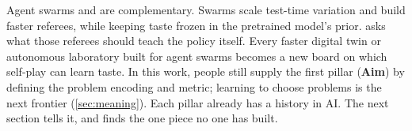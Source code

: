 Agent swarms and \EZ{} are complementary. Swarms scale test-time variation and build faster referees, while keeping taste frozen in the pretrained model's prior. \EZ{} asks what those referees should teach the policy itself. Every faster digital twin or autonomous laboratory built for agent swarms becomes a new board on which self-play can learn taste. In this work, people still supply the first pillar (\textbf{Aim}) by defining the problem encoding and metric; learning to choose problems is the next frontier (\cref{sec:meaning}). Each pillar already has a history in AI. The next section tells it, and finds the one piece no one has built.
